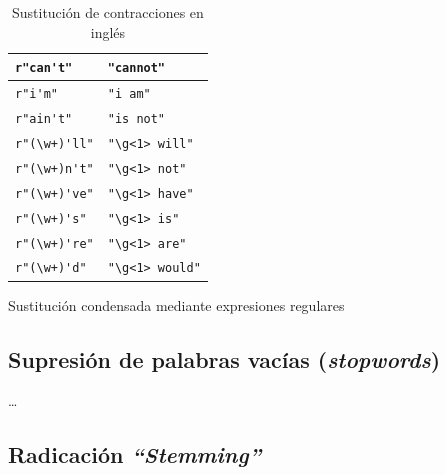 \begin{table}[htbp]
\begin{subtable}[t]{0.45\linewidth}
\begin{tabular}{|l|l|}
\verb=r"can't"= & \verb="cannot"= \\ \hline
\verb=r"i'm"= & \verb="i am"= \\ \hline
\verb=r"ain't"= & \verb="is not"= \\ \hline
\verb=r"(\w+)'ll"= & \verb="\g<1> will"= \\ \hline
\verb=r"(\w+)n't"= & \verb="\g<1> not"= \\ \hline
\verb=r"(\w+)'ve"= & \verb="\g<1> have"= \\ \hline
\verb=r"(\w+)'s"= & \verb="\g<1> is"= \\ \hline
\verb=r"(\w+)'re"= & \verb="\g<1> are"= \\ \hline
\verb=r"(\w+)'d"= & \verb="\g<1> would"= \\ \hline
\end{tabular}
\caption{Sustitución condensada mediante expresiones regulares}
\label{tbl:contracciones-regexp}
\end{subtable}
\vfill
\caption{Sustitución de contracciones en inglés}
\label{tbl:contracciones}
\end{table}

\subsection{Supresión de palabras vacías (\emph{stopwords})}

\ldots

\subsection{Radicación \emph{``Stemming''}}

